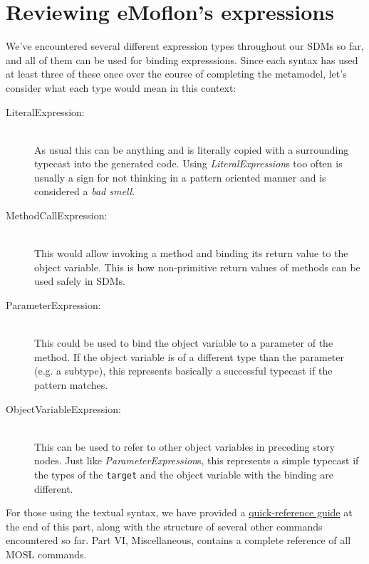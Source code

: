 \newpage
\section{Reviewing eMoflon's expressions}
\genHeader

We've encountered several different expression types throughout our SDMs so far, and all of them can be used for binding expresssions. Since each syntax has
used at least three of these once over the course of completing the metamodel, let's consider what each type would mean in this context:

\begin{description}
  
  \item[LiteralExpression:]~\\ 
  As usual this can be anything and is literally copied with a surrounding typecast 
  into the generated code.  Using \emph{LiteralExpression}s too often is usually a sign 
  for not thinking in a pattern oriented manner and is considered a \emph{bad smell}.
  
  \item[MethodCallExpression:]~\\ 
  This would allow invoking a method and binding its return value to the object variable.  
  This is how non-primitive return values of methods can be used safely in SDMs.
  
  \item[ParameterExpression:]~\\ 
  This could be used to bind the object variable to a parameter of the method.  
  If the object variable is of a different type than the parameter (e.g. a subtype), 
  this represents basically a successful typecast if the pattern matches.
  
  \item[ObjectVariableExpression:]~\\ 
  This can be used to refer to other object variables in preceding story nodes.  
  Just like \emph{ParameterExpression}s, this represents a simple typecast if the 
  types of the \texttt{target} and the object variable with the binding are different.

\end{description}

For those using the textual syntax, we have provided a \hyperlink{quickRef}{quick-reference guide} at the end of this part, along with the structure of
several other commands encountered so far. Part VI, Miscellaneous, contains a complete reference of all MOSL commands.
